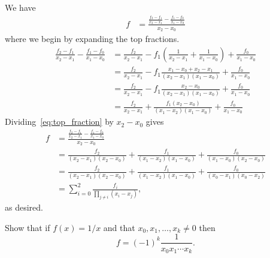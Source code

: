 \begin{solution}{3.1}
    We have
    \begin{align*}
        [x_0, x_1, x_2]f
        &= \frac{
            \frac{f_2 - f_1}{x_2 - x_1}
            - \frac{f_1 - f_0}{x_1 - x_0}
        }{x_2 - x_0}
    \end{align*}
    where we begin by expanding the top fractions.
    \begin{align}
        \frac{f_2 - f_1}{x_2 - x_1} - \frac{f_1 - f_0}{x_1 - x_0}
        &= \frac{f_2}{x_2 - x_1} - f_1 \left( \frac{1}{x_2 - x_1} + \frac{1}{x_1 - x_0} \right) + \frac{f_0}{x_1 - x_0} \nonumber \\
        &= \frac{f_2}{x_2 - x_1} - f_1 \frac{x_1 - x_0 + x_2 - x_1}{(x_2 - x_1)(x_1 - x_0)} + \frac{f_0}{x_1 - x_0} \nonumber \\
        &= \frac{f_2}{x_2 - x_1} - f_1 \frac{x_2 - x_0}{(x_2 - x_1)(x_1 - x_0)} + \frac{f_0}{x_1 - x_0} \nonumber \\
        &= \frac{f_2}{x_2 - x_1} + \frac{f_1(x_2 - x_0)}{(x_1 - x_2)(x_1 - x_0)} + \frac{f_0}{x_1 - x_0} \label{eq:top_fraction}
    \end{align}
    Dividing~\eqref{eq:top_fraction} by $x_2 - x_0$ gives
    \begin{align*}
        [x_0, x_1, x_2]f
        &= \frac{
            \frac{f_2 - f_1}{x_2 - x_1}
            - \frac{f_1 - f_0}{x_1 - x_0}
        }{x_2 - x_0} \\
        &= \frac{f_2}{(x_2 - x_1)(x_2 - x_0)}
        + \frac{f_1}{(x_1 - x_2)(x_1 - x_0)}
        + \frac{f_0}{(x_1 - x_0)(x_2 - x_0)} \\
        &= \frac{f_2}{(x_2 - x_1)(x_2 - x_0)}
        + \frac{f_1}{(x_1 - x_2)(x_1 - x_0)}
        + \frac{f_0}{(x_0 - x_1)(x_0 - x_2)} \\
        &= \sum_{i=0}^{2} \frac{f_i}{\prod_{j \neq i} (x_i - x_j)},
    \end{align*}
    as desired.
\end{solution}

\begin{exercise}{3.3}
    Show that if $f(x) = 1/x$ and that $x_0, x_1, \ldots, x_k \neq 0$ then
    \begin{equation*}
        [x_0, \ldots, x_k]f = (-1)^k \frac{1}{x_0 x_1 \cdots x_k}.
    \end{equation*}
\end{exercise}

